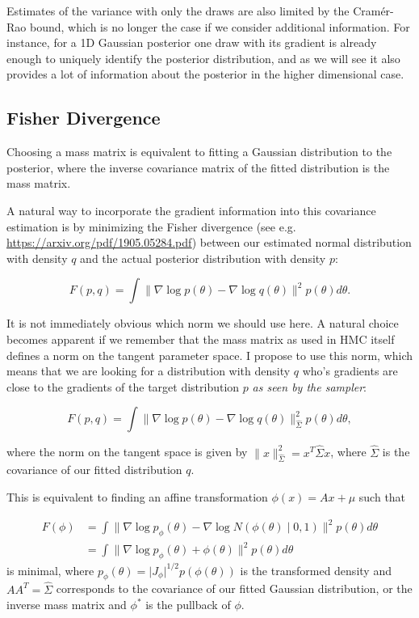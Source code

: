 \documentclass{scrartcl}
\DeclareMathOperator{\jacdet}{jacdet}
\begin{document}
Estimates of the variance with only the draws are also limited by the
Cramér-Rao bound, which is no longer the case if we consider additional
information. For instance, for a 1D Gaussian posterior one draw with its
gradient is already enough to uniquely identify the posterior distribution, and
as we will see it also provides a lot of information about the posterior in the
higher dimensional case.

\subsection{Fisher Divergence}

Choosing a mass matrix is equivalent to fitting a Gaussian distribution to the
posterior, where the inverse covariance matrix of the fitted distribution is
the mass matrix.

A natural way to incorporate the gradient information into this covariance
estimation is by minimizing the Fisher divergence (see e.g.
\url{https://arxiv.org/pdf/1905.05284.pdf}) between our estimated normal
distribution with density $q$ and the actual posterior distribution with
density $p$:

\[
  F(p, q)
    = \int \lVert \nabla \log p(\theta)
      - \nabla \log q(\theta)\rVert^2 p(\theta)d\theta.
\]

It is not immediately obvious which norm we should use here. A natural choice
becomes apparent if we remember that the mass matrix as used in HMC itself
defines a norm on the tangent parameter space. I propose to use this norm,
which means that we are looking for a distribution with density $q$ who's
gradients are close to the gradients of the target distribution $p$ \emph{as
seen by the sampler}:

$$
  F(p, q)
    = \int \lVert \nabla \log p(\theta)
      - \nabla \log q(\theta)\rVert_{\hat\Sigma}^2 p(\theta)d\theta,
$$

where the norm on the tangent space is given by $\lVert x\lVert_{\hat\Sigma}^2
= x^T \hat\Sigma x$, where $\hat\Sigma$ is the covariance of our fitted
distribution $q$.

This is equivalent to finding an affine transformation $\phi(x) = Ax + \mu$
such that

\begin{align}
F(\phi)
  &= \int \lVert \nabla \log p_\phi(\theta)
	- \nabla \log N(\phi(\theta) \mid 0, 1) \rVert^2 p(\theta) d\theta \\
	&= \int \lVert \nabla \log p_\phi(\theta) + \phi(\theta) \rVert^2 p(\theta) d\theta
\end{align}
is minimal, where $p_\phi(\theta) = \lvert J_\phi\rvert^{1/2} p(\phi(\theta))$
is the transformed density and $AA^T = \hat\Sigma$ corresponds to the
covariance of our fitted Gaussian distribution, or the inverse mass matrix
and $\phi^*$ is the pullback of $\phi$.
\end{document}
